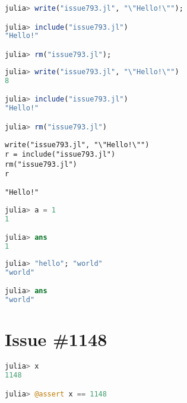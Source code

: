 \label{142823677432440190}{}



\begin{lstlisting}[language=julia, style=jlcodestyle]
julia> write("issue793.jl", "\"Hello!\"");

julia> include("issue793.jl")
"Hello!"

julia> rm("issue793.jl");
\end{lstlisting}




\begin{lstlisting}[language=julia, style=jlcodestyle]
julia> write("issue793.jl", "\"Hello!\"")
8

julia> include("issue793.jl")
"Hello!"

julia> rm("issue793.jl")

\end{lstlisting}




\begin{lstlisting}[]
write("issue793.jl", "\"Hello!\"")
r = include("issue793.jl")
rm("issue793.jl")
r
\end{lstlisting}


\begin{lstlisting}[]
"Hello!"
\end{lstlisting}




\begin{lstlisting}[language=julia, style=jlcodestyle]
julia> a = 1
1

julia> ans
1
\end{lstlisting}




\begin{lstlisting}[language=julia, style=jlcodestyle]
julia> "hello"; "world"
"world"

julia> ans
"world"
\end{lstlisting}



\section{Issue \#1148}



\label{15766399429363808344}{}





\begin{lstlisting}[language=julia, style=jlcodestyle]
julia> x
1148

julia> @assert x == 1148

\end{lstlisting}



